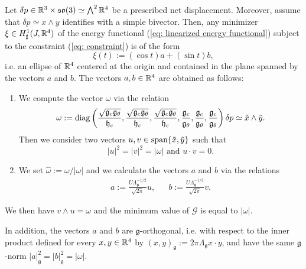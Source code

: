 \begin{theorem}
\label{thm:optimal control curves in the simple case}
Let $\delta p \in \mathbb{R}^3 \times \mathfrak{so}(3) \simeq \bigwedge^2 \mathbb{R}^4$ be a prescribed net displacement. Moreover, assume that $\delta p \simeq x \wedge y$ identifies with a simple bivector. Then, any minimizer $\xi \in H_{\sharp}^1(J, \mathbb{R}^4)$ of the energy functional (\ref{eq: linearized energy functional}) subject to the constraint (\ref{eq: constraint}) is of the form
\begin{equation}
\xi(t) := (\cos t) a + (\sin t) b,
\end{equation}
i.e. an ellipse of $\mathbb{R}^4$ centered at the origin and contained in the plane spanned by the vectors $a$ and $b$. The vectors $a,b \in \mathbb{R}^4$ are obtained as follows:
\begin{enumerate}
\item We compute the vector $\omega$ via the relation
\begin{equation}
\omega := \operatorname{diag} \left (\frac{\sqrt{\mathfrak{g}_c \mathfrak{g}_{\theta}}}{\mathfrak{h}_c}, \frac{\sqrt{\mathfrak{g}_c \mathfrak{g}_{\theta}}}{\mathfrak{h}_c}, \frac{\sqrt{\mathfrak{g}_c \mathfrak{g}_{\theta}}}{\mathfrak{h}_c}, \frac{\mathfrak{g}_c}{\mathfrak{g}_\theta}, \frac{\mathfrak{g}_c}{\mathfrak{g}_\theta}, \frac{\mathfrak{g}_c}{\mathfrak{g}_\theta} \right ) \delta p \simeq \tilde{x} \wedge \tilde{y}.
\end{equation}
Then we consider two vectors $u,v \in \operatorname{span}\{\tilde{x}, \tilde{y}\}$ such that
\begin{equation}
\label{eq:global minimizer condition}
|u|^2 = |v|^2 = |\omega| \text{ and } u \cdot v = 0.
\end{equation}

\item We set $\hat{\omega} := \omega/|\omega|$ and we calculate the vectors $a$ and $b$ via the relations
\begin{equation}
\label{eq:global minimizer form}
\begin{aligned}
a := \frac{U \Lambda_{\mathfrak{g}}^{-1/2}}{\sqrt{2 \pi}} u,&& b := \frac{U \Lambda_{\mathfrak{g}}^{-1/2}}{\sqrt{2 \pi}} v.
\end{aligned}
\end{equation}
\end{enumerate}
We then have $ v \wedge u = \omega$ and the minimum value of $\mathcal{G}$ is equal to $|\omega|$.

In addition, the vectors $a$ and $b$ are $\mathfrak{g}$-orthogonal, i.e. with respect to the inner product defined for every $x,y \in \mathbb{R}^4$ by $(x, y)_{\mathfrak{g}} := 2 \pi \Lambda_{\mathfrak{g}} x \cdot y$, and have the same $\mathfrak{g}$-norm $|a|_{\mathfrak{g}}^2 = |b|_{\mathfrak{g}}^2 = |\omega|$. 
\end{theorem}


